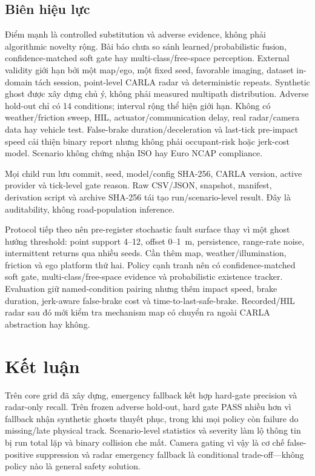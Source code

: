 \documentclass[conference]{IEEEtran}
\begin{document}
\subsection{Biên hiệu lực}
Điểm mạnh là controlled substitution và adverse evidence, không phải algorithmic
novelty rộng. Bài báo chưa so sánh learned/probabilistic fusion, confidence-matched
soft gate hay multi-class/free-space perception. External validity giới hạn bởi
một map/ego, một fixed seed, favorable imaging, dataset in-domain tách session,
point-level CARLA radar và deterministic repeats. Synthetic ghost được xây dựng
chủ ý, không phải measured multipath distribution. Adverse hold-out chỉ có 14
conditions; interval rộng thể hiện giới hạn. Không có weather/friction sweep,
HIL, actuator/communication delay, real radar/camera data hay vehicle test.
False-brake duration/deceleration và last-tick pre-impact speed cải thiện binary
report nhưng không phải occupant-risk hoặc jerk-cost model. Scenario không chứng
nhận ISO hay Euro NCAP compliance.

Mọi child run lưu commit, seed, model/config SHA-256, CARLA version, active
provider và tick-level gate reason. Raw CSV/JSON, snapshot, manifest, derivation
script và archive SHA-256 tái tạo run/scenario-level result. Đây là auditability,
không road-population inference.

Protocol tiếp theo nên pre-register stochastic fault surface thay vì một ghost
hướng threshold: point support 4--12, offset 0--1~m, persistence, range-rate
noise, intermittent returns qua nhiều seeds. Cần thêm map, weather/illumination,
friction và ego platform thứ hai. Policy cạnh tranh nên có confidence-matched
soft gate, multi-class/free-space evidence và probabilistic existence tracker.
Evaluation giữ named-condition pairing nhưng thêm impact speed, brake duration,
jerk-aware false-brake cost và time-to-last-safe-brake. Recorded/HIL radar sau đó
mới kiểm tra mechanism map có chuyển ra ngoài CARLA abstraction hay không.

\section{Kết luận}
Trên core grid đã xây dựng, emergency fallback kết hợp hard-gate precision và
radar-only recall. Trên frozen adverse hold-out, hard gate PASS nhiều hơn vì
fallback nhận synthetic ghosts thuyết phục, trong khi mọi policy còn failure do
missing/late physical track. Scenario-level statistics và severity làm lộ thông
tin bị run total lặp và binary collision che mất. Camera gating vì vậy là cơ chế
false-positive suppression và radar emergency fallback là conditional
trade-off---không policy nào là general safety solution.

\balance


\end{document}
